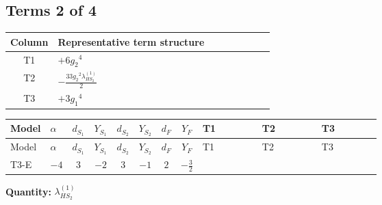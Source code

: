 \documentclass[8pt]{article}
\begin{document}
\begin{landscape}
\subsection*{Terms 2 of 4}
\begin{center}
\begin{tabular}{@{}c >{\raggedright\arraybackslash}p{0.82\linewidth}@{}}
\toprule
Column & Representative term structure \\
\midrule
T1 & \(\displaystyle +6 {g_2}^4\) \\
\midrule
T2 & \(\displaystyle -\frac{33 {g_2}^2 {\lambda_{HS_2}^{(1)}}}{2}\) \\
\midrule
T3 & \(\displaystyle +3 {g_1}^4\) \\
\midrule
\bottomrule
\end{tabular}
\end{center}
\smallskip
\tiny
\begin{longtable}{@{}llcccccc >{\raggedright\arraybackslash}p{0.21\linewidth} >{\raggedright\arraybackslash}p{0.21\linewidth} >{\raggedright\arraybackslash}p{0.21\linewidth}@{}}
\toprule
Model & $\alpha$ & $d_{S_1}$ & $Y_{S_1}$ & $d_{S_2}$ & $Y_{S_2}$ & $d_F$ & $Y_F$ & T1 & T2 & T3 \\
\midrule
\endfirsthead
\toprule
Model & $\alpha$ & $d_{S_1}$ & $Y_{S_1}$ & $d_{S_2}$ & $Y_{S_2}$ & $d_F$ & $Y_F$ & T1 & T2 & T3 \\
\midrule
\endhead
T3-E & $-4$ & $3$ & $-2$ & $3$ & $-1$ & $2$ & $-\frac{3}{2}$ & \scriptsize\adjustbox{max width=\linewidth}{$\begin{gathered} +6 {g_2}^4\end{gathered}$} & \scriptsize\adjustbox{max width=\linewidth}{$\begin{gathered} -\frac{33 {g_2}^2 {\lambda_{HS_2}^{(1)}}}{2}\end{gathered}$} & \scriptsize\adjustbox{max width=\linewidth}{$\begin{gathered} +3 {g_1}^4\end{gathered}$} \\
\midrule
\bottomrule
\end{longtable}
\clearpage
\noindent\textbf{Quantity: }$\lambda_{HS_2}^{(1)}$\par\smallskip

\end{landscape}
\end{document}

